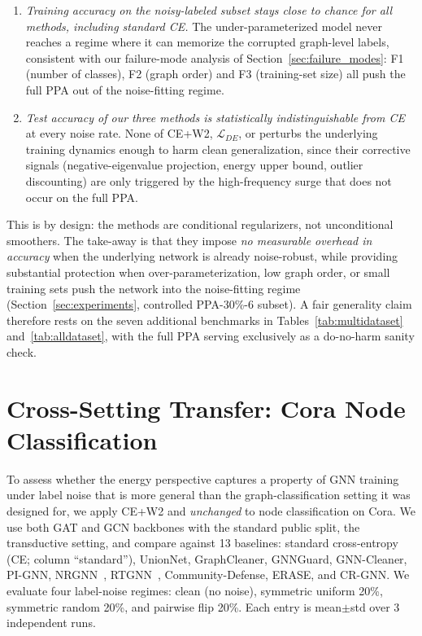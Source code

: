 \begin{enumerate}[leftmargin=*,itemsep=0.5pt,topsep=2pt]
\item \emph{Training accuracy on the noisy-labeled subset stays close to chance for all methods, including standard CE.} The under-parameterized model never reaches a regime where it can memorize the corrupted graph-level labels, consistent with our failure-mode analysis of Section~\ref{sec:failure_modes}: F1 (number of classes), F2 (graph order) and F3 (training-set size) all push the full PPA out of the noise-fitting regime.

\item \emph{Test accuracy of our three methods is statistically indistinguishable from CE} at every noise rate. None of CE+W2, $\mathcal{L}_{DE}$, or \method{} perturbs the underlying training dynamics enough to harm clean generalization, since their corrective signals (negative-eigenvalue projection, energy upper bound, outlier discounting) are only triggered by the high-frequency surge that does not occur on the full PPA.
\end{enumerate}

This is by design: the methods are conditional regularizers, not unconditional smoothers. The take-away is that they impose \emph{no measurable overhead in accuracy} when the underlying network is already noise-robust, while providing substantial protection when over-parameterization, low graph order, or small training sets push the network into the noise-fitting regime (Section~\ref{sec:experiments}, controlled PPA-30\%-6 subset). A fair generality claim therefore rests on the seven additional benchmarks in Tables~\ref{tab:multidataset} and~\ref{tab:alldataset}, with the full PPA serving exclusively as a do-no-harm sanity check.

\section{Cross-Setting Transfer: Cora Node Classification}
\label{app:cora}

To assess whether the energy perspective captures a property of GNN training under label noise that is more general than the graph-classification setting it was designed for, we apply CE+W2 and \method{} \emph{unchanged} to node classification on Cora. We use both GAT and GCN backbones with the standard public split, the transductive setting, and compare against 13 baselines: standard cross-entropy (CE; column ``standard''), UnionNet, GraphCleaner, GNNGuard, GNN-Cleaner, PI-GNN, NRGNN~\citep{nrgnn11}, RTGNN~\citep{contrastivelearning5}, Community-Defense, ERASE, and CR-GNN. We evaluate four label-noise regimes: clean (no noise), symmetric uniform 20\%, symmetric random 20\%, and pairwise flip 20\%. Each entry is mean$\pm$std over 3 independent runs.

